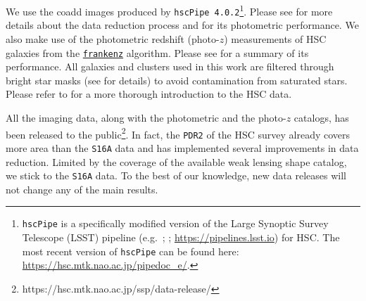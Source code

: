 \documentclass[fleqn,usenatbib,useAMS,english]{mnras}
\begin{document}
    We use the coadd images produced by \texttt{hscPipe 4.0.2}\footnote{
        \texttt{hscPipe} is a specifically modified version of the Large Synoptic Survey
        Telescope (LSST) pipeline (e.g.\ \citealt{Juric2015}; \citealt{Axelrod2010};
        {\url{https://pipelines.lsst.io}}) for HSC.
        The most recent version of \texttt{hscPipe} can be found here:
        \url{https://hsc.mtk.nao.ac.jp/pipedoc_e/}.
    }.
    Please see \citet{HSC-PIPE} for more details about the data reduction process and
    \citet{SynPipe} for its photometric performance.
    We also make use of the photometric redshift (photo-$z$) measurements of HSC galaxies from
    the \href{https://github.com/joshspeagle/frankenz}{\texttt{frankenz}}
    \citep{Speagle2019} algorithm. Please see \citet{HSC-PHOTOZ} for a summary of its
    performance.
    All galaxies and clusters used in this work are filtered through bright star masks
    (see \citealt{HSC-STAR} for details) to avoid contamination from saturated stars. Please
    refer to \citet{Huang2018b, Huang2018c, Huang2020} for a more thorough introduction to the
    HSC data.

    All the imaging data, along with the photometric and the photo-$z$ catalogs, has been released
    to the public\footnote{https://hsc.mtk.nao.ac.jp/ssp/data-release/}.
    In fact, the \texttt{PDR2} of the HSC survey already covers more area than the \texttt{S16A}
    data and has implemented several improvements in data reduction.
    Limited by the coverage of the available weak lensing shape catalog, we stick to the
    \texttt{S16A} data. To the best of our knowledge, new data releases will not change any of
    the main results.

\end{document}
